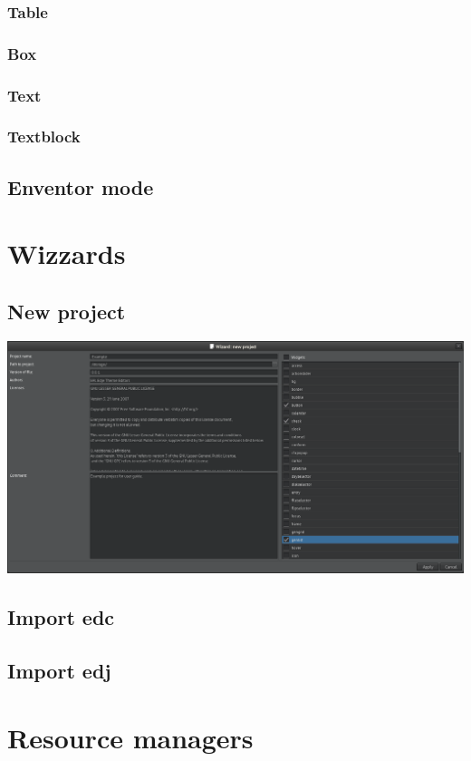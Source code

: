 \documentclass[titlepage,oneside,11pt]{book}
\begin{document}
\subsubsection{Table}
\subsubsection{Box}
\subsubsection{Text}
\subsubsection{Textblock}
\subsection{Enventor mode}
\section{Wizzards}
\subsection{New project}
\includegraphics[scale=0.2]{images/wizzard_new_project.png}\newline
\subsection{Import edc}
\subsection{Import edj}
\section{Resource managers}
\end{document}
